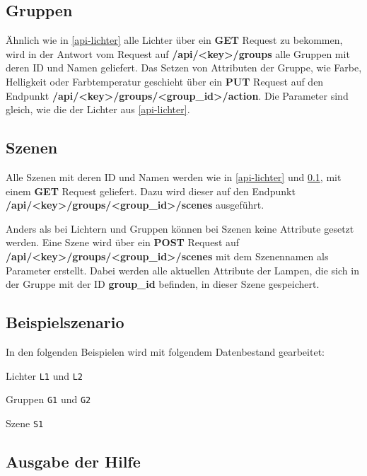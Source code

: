 \documentclass[a4paper,12pt]{article}
\begin{document}
\subsection{Gruppen}
\label{api-gruppen}

Ähnlich wie in \ref{api-lichter} alle Lichter über ein \textbf{GET}
Request zu bekommen, wird in der Antwort vom Request auf
\textbf{/api/<key>/groups} alle Gruppen mit deren ID und Namen geliefert.
Das Setzen von Attributen der Gruppe, wie Farbe, Helligkeit oder
Farbtemperatur geschieht über ein \textbf{PUT} Request auf den Endpunkt
\textbf{/api/<key>/groups/<group\_id>/action}. Die Parameter sind gleich,
wie die der Lichter aus \ref{api-lichter}.


\subsection{Szenen}
\label{api-szenen}

Alle Szenen mit deren ID und Namen werden wie in \ref{api-lichter} und
\ref{api-gruppen}, mit einem \textbf{GET} Request geliefert. Dazu wird
dieser auf den Endpunkt \newline \textbf{/api/<key>/groups/<group\_id>/scenes}
ausgeführt.

Anders als bei Lichtern und Gruppen können bei Szenen keine Attribute
gesetzt werden. Eine Szene wird über ein \textbf{POST} Request auf
\newline \textbf{/api/<key>/groups/<group\_id>/scenes} mit dem Szenennamen
als Parameter erstellt. Dabei werden alle aktuellen Attribute der Lampen,
die sich in der Gruppe mit der ID \textbf{group\_id} befinden, in dieser
Szene gespeichert.


\subsection{Beispielszenario}

In den folgenden Beispielen wird mit folgendem Datenbestand gearbeitet:

\noindent
Lichter \texttt{L1} und \texttt{L2}

\noindent
Gruppen \texttt{G1} und \texttt{G2}

\noindent
Szene \texttt{S1}

\subsection{Ausgabe der Hilfe}
\end{document}
